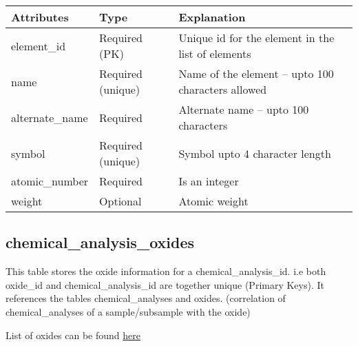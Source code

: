 \documentclass[letterpaper,10pt,english]{sphinxmanual}
\begin{document}
\begin{tabulary}{\linewidth}{|L|L|L|}
\hline
\textbf{
Attributes
} & \textbf{
Type
} & \textbf{
Explanation
}\\\hline

element\_id
 & 
Required (PK)
 & 
Unique id for the element in the list of elements
\\\hline

name
 & 
Required (unique)
 & 
Name of the element – upto 100 characters allowed
\\\hline

alternate\_name
 & 
Required
 & 
Alternate name – upto 100 characters
\\\hline

symbol
 & 
Required (unique)
 & 
Symbol upto 4 character length
\\\hline

atomic\_number
 & 
Required
 & 
Is an integer
\\\hline

weight
 & 
Optional
 & 
Atomic weight
\\\hline
\end{tabulary}



\subsection{chemical\_analysis\_oxides}
\label{Table_Description:chemical-analysis-oxides}
This table stores the oxide information for a chemical\_analysis\_id. i.e both oxide\_id and chemical\_analysis\_id are together unique (Primary Keys). It references the tables chemical\_analyses and oxides. (correlation of chemical\_analyses of a sample/subsample with the oxide)

List of oxides can be found \href{http://wiki.cs.rpi.edu/trac/metpetdb/wiki/Oxide}{here}
\end{document}
